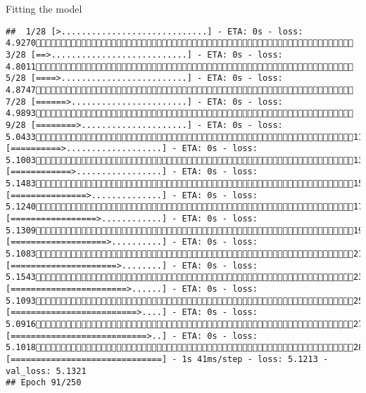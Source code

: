 \documentclass[
  ignorenonframetext,
]{beamer}
\begin{document}
\begin{frame}[fragile]{Fitting the model}
\begin{verbatim}
##  1/28 [>.............................] - ETA: 0s - loss: 4.9270 3/28 [==>...........................] - ETA: 0s - loss: 4.8011 5/28 [====>.........................] - ETA: 0s - loss: 4.8747 7/28 [======>.......................] - ETA: 0s - loss: 4.9893 9/28 [========>.....................] - ETA: 0s - loss: 5.043311/28 [==========>...................] - ETA: 0s - loss: 5.100313/28 [============>.................] - ETA: 0s - loss: 5.148315/28 [===============>..............] - ETA: 0s - loss: 5.124017/28 [=================>............] - ETA: 0s - loss: 5.130919/28 [===================>..........] - ETA: 0s - loss: 5.108321/28 [=====================>........] - ETA: 0s - loss: 5.154323/28 [=======================>......] - ETA: 0s - loss: 5.109325/28 [=========================>....] - ETA: 0s - loss: 5.091627/28 [===========================>..] - ETA: 0s - loss: 5.101828/28 [==============================] - 1s 41ms/step - loss: 5.1213 - val_loss: 5.1321
## Epoch 91/250

\end{verbatim}
\end{frame}
\end{document}
